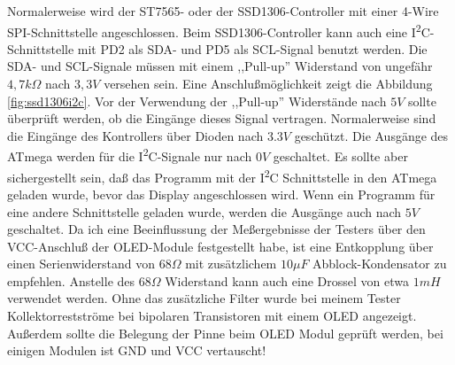 Normalerweise wird der ST7565- oder der SSD1306-Controller mit einer 4-Wire SPI-Schnittstelle angeschlossen.
Beim SSD1306-Controller kann auch eine I\textsuperscript{2}C-Schnittstelle mit PD2 als SDA- und PD5 als SCL-Signal benutzt werden.
Die SDA- und SCL-Signale müssen mit einem ,,Pull-up'' Widerstand von ungefähr \(4,7k\Omega\) nach \(3,3V\) versehen sein.
Eine Anschlußmöglichkeit zeigt die Abbildung \ref{fig:ssd1306i2c}.
Vor der Verwendung der ,,Pull-up'' Widerstände nach \(5V\) sollte überprüft werden, ob die Eingänge dieses Signal vertragen.
Normalerweise sind die Eingänge des Kontrollers über Dioden nach \(3.3V\) geschützt.
Die Ausgänge des ATmega werden für die I\textsuperscript{2}C-Signale nur nach \(0V\) geschaltet.
Es sollte aber sichergestellt sein, daß das Programm mit der I\textsuperscript{2}C Schnittstelle in den ATmega geladen wurde,
bevor das Display angeschlossen wird. Wenn ein Programm für eine andere Schnittstelle geladen wurde,
werden die Ausgänge auch nach \(5V\) geschaltet.
Da ich eine Beeinflussung der Meßergebnisse der Testers über den VCC-Anschluß der OLED-Module festgestellt habe, 
ist eine Entkopplung über einen Serienwiderstand von \(68\Omega\) mit zusätzlichem \(10\mu F\)
 Abblock-Kondensator zu empfehlen. 
Anstelle des \(68\Omega\) Widerstand kann auch eine Drossel von etwa \(1mH\) verwendet werden.
Ohne das zusätzliche Filter wurde bei meinem Tester Kollektorrestströme bei bipolaren Transistoren mit einem OLED angezeigt.
Außerdem sollte die Belegung der Pinne beim OLED Modul geprüft werden, bei einigen Modulen ist GND und VCC vertauscht!
 
